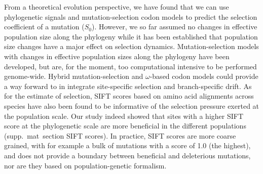 \documentclass{article}
\newcommand{\Sphy}{S_{0}}
\begin{document}
    From a theoretical evolution perspective, we have found that we can use phylogenetic signals and mutation-selection codon models to predict the selection coefficient of a mutation ($\Sphy$).
    However, we so far assumed no changes in effective population size along the phylogeny while it has been established that population size changes have a major effect on selection dynamics\cite{lanfear_population_2014, jones_shifting_2017, platt_protein_2018}.
    Mutation-selection models with changes in effective population sizes along the phylogeny have been developed\cite{latrille_inferring_2021a}, but are, for the moment, too computational intensive to be performed genome-wide.
    Hybrid mutation-selection and $\omega$-based codon models could provide a way forward to in integrate site-specific selection and branch-specific drift\cite{brevet_reconstructing_2021a}.
    As for the estimate of selection, SIFT scores based on amino acid alignments across species have also been found to be informative of the selection pressure exerted at the population scale\cite{chen_hunting_2021}.
    Our study indeed showed that sites with a higher SIFT score at the phylogenetic scale are more beneficial in the different populations (supp.\ mat\  section SIFT scores).
    In practice, SIFT scores are more coarse grained, with for example a bulk of mutations with a score of 1.0 (the highest), and does not provide a boundary between beneficial and deleterious mutations, nor are they based on population-genetic formalism.
\end{document}
